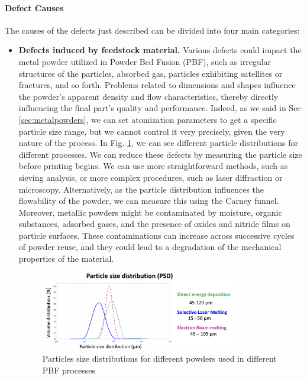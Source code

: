 \paragraph{Defect Causes} The causes of the defects just described can be divided into four main categories:
\begin{itemize}
    \item \textbf{Defects induced by feedstock material.} Various defects could impact the metal powder utilized in Powder Bed Fusion (PBF), such as irregular structures of the particles, absorbed gas, particles exhibiting satellites or fractures, and so forth. Problems related to dimensions and shapes influence the powder's apparent density and flow characteristics, thereby directly influencing the final part's quality and performance. Indeed, as we said in Sec \ref{sec:metalpowders}, we can set atomization parameters to get a specific particle size range, but we cannot control it very precisely, given the very nature of the process. In Fig. \ref{fig:particlesdistributions}, we can see different particle distributions for different processes. We can reduce these defects by measuring the particle size before printing begins. We can use more straightforward methods, such as sieving analysis, or more complex procedures, such as laser diffraction or microscopy. Alternatively, as the particle distribution influences the flowability of the powder, we can measure this using the Carney funnel. Moreover, metallic powders might be contaminated by moisture, organic substances, adsorbed gases, and the presence of oxides and nitride films on particle surfaces. These contaminations can increase across successive cycles of powder reuse, and they could lead to a degradation of the mechanical properties of the material.
\begin{figure}
    \centering
    \includegraphics[width=0.8\textwidth]{Images/particlesdistributions.png}
    \caption[Particles distribution.]{Particles size distributions for different powders used in different PBF processes}
    \label{fig:particlesdistributions}
\end{figure}

\end{itemize}
